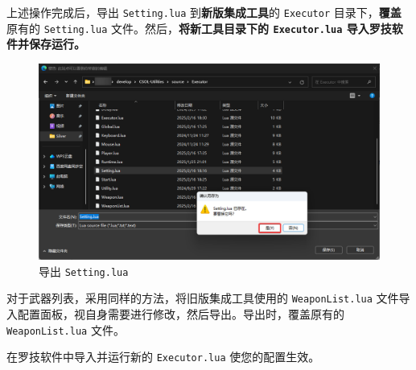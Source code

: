 上述操作完成后，导出 \lstinline{Setting.lua} 到\textbf{\color{red}新版集成工具}的 \lstinline{Executor} 目录下，\textbf{\color{red}覆盖}原有的 \lstinline{Setting.lua} 文件。然后，\textbf{\color{red}将新工具目录下的 \lstinline{Executor.lua} 导入罗技软件并保存运行。}

\begin{figure}[H]
    \Centering
    \includegraphics[width=\textwidth]{assets/override_setting}
    \caption{导出 \lstinline{Setting.lua}}
\end{figure}

对于武器列表，采用同样的方法，将旧版集成工具使用的 \lstinline{WeaponList.lua} 文件导入配置面板，视自身需要进行修改，然后导出。导出时，覆盖原有的 \lstinline{WeaponList.lua} 文件。

在罗技软件中导入并运行新的 \lstinline{Executor.lua} 使您的配置生效。